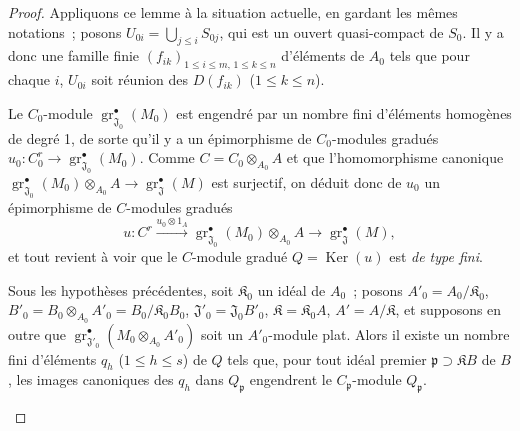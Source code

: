 \begin{proof}
Appliquons ce lemme à la situation actuelle, en gardant les mêmes notations~;
posons $U_{0i}=\bigcup_{j\leq i}S_{0j}$, qui est un ouvert quasi-compact de
$S_0$. Il y a donc une famille
finie $(f_{ik})_{1\leq i\leq m,\,1\leq k\leq n}$ d'éléments de $A_0$ tels que pour
chaque $i$, $U_{0i}$ soit réunion des $D(f_{ik})$ ($1\leq k\leq n$).


Le $C_0$-module $\operatorname{gr}_{\mathfrak J_0}^\bullet(M_0)$ est engendré par
un nombre fini d'éléments homogènes de degré 1, de sorte qu'il y a un
épimorphisme de $C_0$-modules gradués
$u_0:C_0^r\longrightarrow\operatorname{gr}_{\mathfrak J_0}^\bullet(M_0)$.
Comme $C=C_0\otimes_{A_0}A$ et que l'homomorphisme canonique
$\operatorname{gr}_{\mathfrak J_0}^\bullet(M_0)\otimes_{A_0}A
\to\operatorname{gr}_{\mathfrak J}^\bullet(M)$ est surjectif, on déduit donc de
$u_0$ un épimorphisme de $C$-modules gradués
\[
u:C^r\xrightarrow{u_0\otimes1_A}
\operatorname{gr}_{\mathfrak J_0}^\bullet(M_0)\otimes_{A_0}A
\longrightarrow\operatorname{gr}_{\mathfrak J}^\bullet(M),
\]
et tout revient à voir que le $C$-module gradué $Q=\operatorname{Ker}(u)$ est \emph{de type
fini}.

\begin{lemma}[11.2.9.6]
\label{IV.11.2.9.6-fr}
Sous les hypothèses précédentes, soit $\mathfrak K_0$ un idéal de $A_0$~;
posons
$A'_0=A_0/\mathfrak K_0$, $B'_0=B_0\otimes_{A_0}A'_0=B_0/\mathfrak K_0B_0$,
$\mathfrak J'_0=\mathfrak J_0B'_0$, $\mathfrak K=\mathfrak K_0A$, $A'=A/\mathfrak K$, et supposons en outre
que $\operatorname{gr}_{\mathfrak J'_0}^\bullet(M_0\otimes_{A_0}A'_0)$ soit un
$A'_0$-module plat. Alors il existe un nombre fini d'éléments $q_h$
\textup{(}$1\leq h\leq s$\textup{)} de $Q$ tels que, pour tout idéal premier
$\mathfrak p\supset\mathfrak KB$ de $B$, les images canoniques des $q_h$ dans
$Q_\mathfrak p$ engendrent le $C_\mathfrak p$-module $Q_\mathfrak p$.
\end{lemma}


\end{proof}
